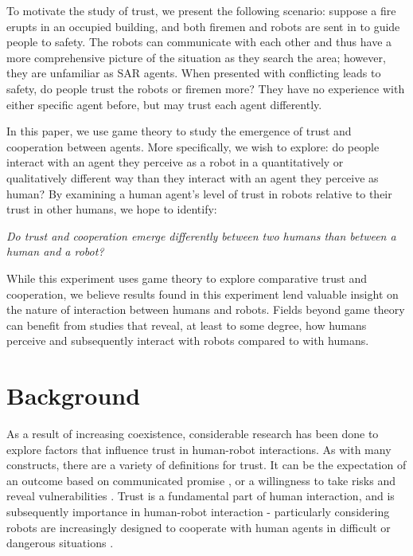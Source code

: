 \documentclass{sig-alternate}
\begin{document}
To motivate the study of trust, we present the following scenario: suppose a fire erupts in an occupied building, and both firemen and robots are sent in to guide people to safety. The robots can communicate with each other and thus have a more comprehensive picture of the situation as they search the area; however, they are unfamiliar as SAR agents. When presented with conflicting leads to safety, do people trust the robots or firemen more? They have no experience with either specific agent before, but may trust each agent differently.

In this paper, we use game theory to study the emergence of trust and cooperation between agents. More specifically, we wish to explore: do people interact with an agent they perceive as a robot in a quantitatively or qualitatively different way than they interact with an agent they perceive as human? By examining a human agent's level of trust in robots relative to their trust in other humans, we hope to identify:

\indent \textit{Do trust and cooperation emerge differently between two humans than between a human and a robot?}

While this experiment uses game theory to explore comparative trust and cooperation, we believe results found in this experiment lend valuable insight on the nature of interaction between humans and robots. Fields beyond game theory can benefit from studies that reveal, at least to some degree, how humans perceive and subsequently interact with robots compared to with humans.

\section{Background}
As a result of increasing coexistence, considerable research has been done to explore factors that influence trust in human-robot interactions. As with many constructs, there are a variety of definitions for trust. It can be the expectation of an outcome based on communicated promise \cite{rotter1967new}, or a willingness to take risks and reveal vulnerabilities \cite{lee2004trust}. Trust is a fundamental part of human interaction, and is subsequently importance in human-robot interaction - particularly considering robots are increasingly designed to cooperate with human agents in difficult or dangerous situations \cite{casper2003human}.
\end{document}
